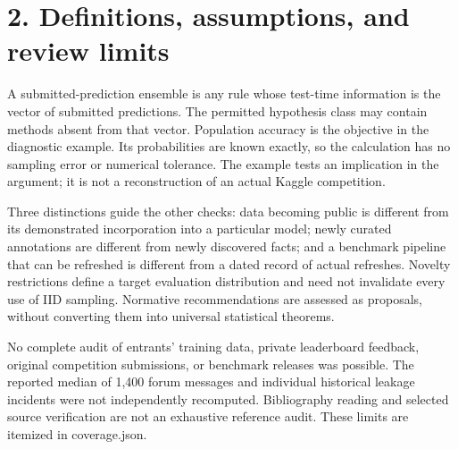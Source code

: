 \documentclass[10pt]{article}
\begin{document}
\section*{2. Definitions, assumptions, and review limits}
A submitted-prediction ensemble is any rule whose test-time information is the vector of submitted predictions. The permitted hypothesis class may contain methods absent from that vector. Population accuracy is the objective in the diagnostic example. Its probabilities are known exactly, so the calculation has no sampling error or numerical tolerance. The example tests an implication in the argument; it is not a reconstruction of an actual Kaggle competition.\par
Three distinctions guide the other checks: data becoming public is different from its demonstrated incorporation into a particular model; newly curated annotations are different from newly discovered facts; and a benchmark pipeline that can be refreshed is different from a dated record of actual refreshes. Novelty restrictions define a target evaluation distribution and need not invalidate every use of IID sampling. Normative recommendations are assessed as proposals, without converting them into universal statistical theorems.\par
No complete audit of entrants’ training data, private leaderboard feedback, original competition submissions, or benchmark releases was possible. The reported median of 1,400 forum messages and individual historical leakage incidents were not independently recomputed. Bibliography reading and selected source verification are not an exhaustive reference audit. These limits are itemized in coverage.json.\par
\end{document}
